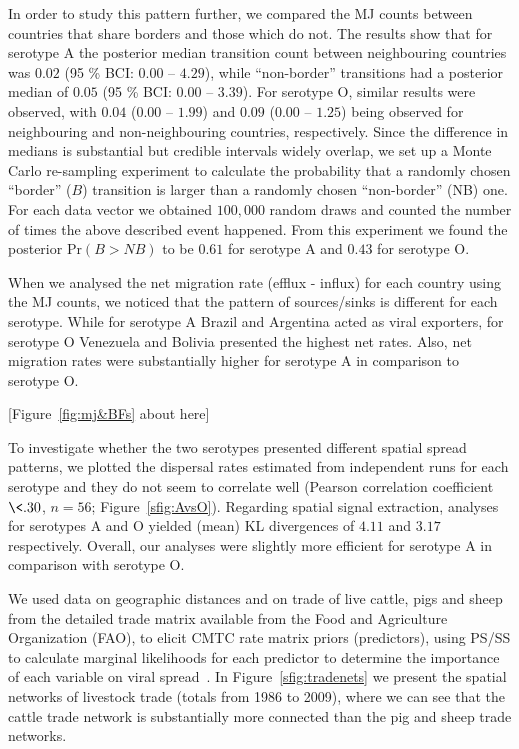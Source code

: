 \documentclass[10pt]{article}
\begin{document}
In order to study this pattern further, we compared the MJ counts between countries that share borders and those which do not.
The results show that for serotype A the posterior median transition count between neighbouring countries was $0.02$ (95 \% BCI: $0.00$ -- $4.29$), while ``non-border'' transitions had a posterior median of $0.05$ (95 \% BCI: $0.00$ --  $3.39$).
For serotype O, similar results were observed, with $0.04$ ($0.00$ -- $1.99$) and $0.09$ ($0.00$ -- $1.25$) being observed for neighbouring and non-neighbouring countries, respectively.
Since the difference in medians is substantial but credible intervals widely overlap, we set up a Monte Carlo re-sampling experiment to calculate the probability that a randomly chosen ``border'' ($B$) transition is larger than a randomly chosen ``non-border'' (NB) one. For each data vector we obtained $100,000$ random draws and counted the number of times the above described event happened. From this experiment we found the posterior $\mbox{Pr}(B>NB)$  to be $0.61$ for serotype A and $0.43$ for serotype O. %

When we analysed the net migration rate (efflux - influx) for each country using the MJ counts, we noticed that the pattern of sources/sinks is different for each serotype.
While for serotype A Brazil and Argentina acted as viral exporters, for serotype O Venezuela and Bolivia presented the highest net rates.
Also, net migration rates were substantially higher for serotype A in comparison to serotype O.

\begin{center}
 [Figure~\ref{fig:mj&BFs} about here]
\end{center}

To investigate whether the two serotypes presented different spatial spread patterns, we plotted the dispersal rates estimated from independent runs for each serotype and they do not seem to correlate well (Pearson correlation coefficient $\<.30$, $n = 56$; Figure~\ref{sfig:AvsO}). %
Regarding spatial signal extraction, analyses for serotypes  A and O yielded (mean) KL divergences of $4.11$ and $3.17$ respectively.
Overall, our analyses were slightly more efficient for serotype A in comparison with serotype O.

We used data on geographic distances and on trade of live cattle, pigs and sheep from the detailed trade matrix available from the Food and Agriculture Organization (FAO), to elicit CMTC rate matrix priors (predictors), using PS/SS to calculate marginal likelihoods for each predictor to determine the importance of each variable on viral spread~\cite{Carvalho2013, Nelson2011}.
In Figure~\ref{sfig:tradenets} we present the spatial networks of livestock trade (totals from 1986 to 2009), where we can see that the cattle trade network is substantially more connected than the pig and sheep trade networks.   
\end{document}
